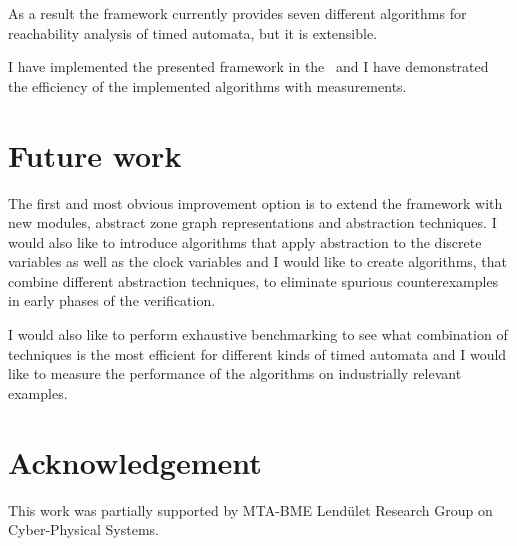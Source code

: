 As a result the framework currently provides seven different algorithms for reachability analysis of timed automata, but it is extensible.

I have implemented the presented framework in the \ttmcfw\ and I have demonstrated the efficiency of the implemented algorithms with measurements.

\section{Future work}

The first and most obvious improvement option is to extend the framework with new modules, abstract zone graph representations and abstraction techniques. I would also like to introduce algorithms that apply abstraction to the discrete variables as well as the clock variables and I would like to create algorithms, that combine different abstraction techniques, to eliminate spurious counterexamples in early phases of the verification.

I would also like to perform exhaustive benchmarking to see what combination of techniques is the most efficient for different kinds of timed automata and I would like to measure the performance of the algorithms on industrially relevant examples.

\section*{Acknowledgement} This work was partially supported by MTA-BME Lendület Research Group on Cyber-Physical Systems.